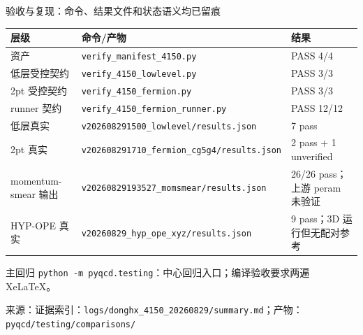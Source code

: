 \documentclass[UTF8,aspectratio=169,11pt]{ctexbeamer}
\newcommand{\source}[1]{\vspace{0.05em}\par{\raggedright\scriptsize\color{muted}来源：#1\par}}
\newcommand{\codepath}[1]{\nolinkurl{#1}}
\begin{document}
\begin{frame}[t]{验收与复现：命令、结果文件和状态语义均已留痕}
  \footnotesize
  \renewcommand{\arraystretch}{1.00}
  \begin{tabularx}{0.96\textwidth}{@{}L Y l@{}}
    \toprule
    层级 & 命令/产物 & 结果\\
    \midrule
    资产 & \codepath{verify_manifest_4150.py} & PASS 4/4\\
    低层受控契约 & \codepath{verify_4150_lowlevel.py} & PASS 3/3\\
    2pt 受控契约 & \codepath{verify_4150_fermion.py} & PASS 3/3\\
    runner 契约 & \codepath{verify_4150_fermion_runner.py} & PASS 12/12\\
    低层真实 & \codepath{v202608291500_lowlevel/results.json} & 7 pass\\
    2pt 真实 & \codepath{v202608291710_fermion_cg5g4/results.json} & 2 pass + 1 unverified\\
    momentum-smear 输出 & \codepath{v20260829193527_momsmear/results.json} & 26/26 pass；上游 peram 未验证\\
    HYP-OPE 真实 & \codepath{v20260829_hyp_ope_xyz/results.json} & 9 pass；3D 运行但无配对参考\\
    \bottomrule
  \end{tabularx}
  \vspace{0.10em}
  \begin{block}{主回归}
    \texttt{python -m pyqcd.testing}：中心回归入口；编译验收要求两遍 XeLaTeX。
  \end{block}
  \source{证据索引：\codepath{logs/donghx_4150_20260829/summary.md}；产物：\codepath{pyqcd/testing/comparisons/}}
\end{frame}

\appendix
\end{document}
